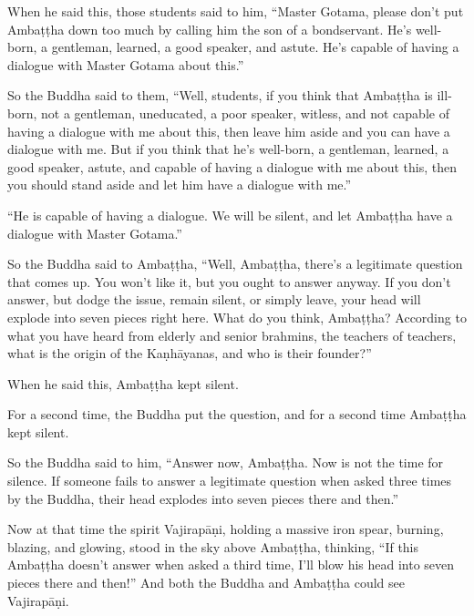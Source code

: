 \documentclass[12pt,openany]{book}%
\begin{document}
When he said this, those students said to him, “Master Gotama, please don’t put \textsanskrit{Ambaṭṭha} down too much by calling him the son of a bondservant. He’s well-born, a gentleman, learned, a good speaker, and astute. He’s capable of having a dialogue with Master Gotama about this.” 

So the Buddha said to them, “Well, students, if you think that \textsanskrit{Ambaṭṭha} is ill-born, not a gentleman, uneducated, a poor speaker, witless, and not capable of having a dialogue with me about this, then leave him aside and you can have a dialogue with me. But if you think that he’s well-born, a gentleman, learned, a good speaker, astute, and capable of having a dialogue with me about this, then you should stand aside and let him have a dialogue with me.” 

“He is capable of having a dialogue. We will be silent, and let \textsanskrit{Ambaṭṭha} have a dialogue with Master Gotama.” 

So the Buddha said to \textsanskrit{Ambaṭṭha}, “Well, \textsanskrit{Ambaṭṭha}, there’s a legitimate question that comes up. You won’t like it, but you ought to answer anyway. If you don’t answer, but dodge the issue, remain silent, or simply leave, your head will explode into seven pieces right here. What do you think, \textsanskrit{Ambaṭṭha}? According to what you have heard from elderly and senior brahmins, the teachers of teachers, what is the origin of the \textsanskrit{Kaṇhāyanas}, and who is their founder?” 

When he said this, \textsanskrit{Ambaṭṭha} kept silent. 

For a second time, the Buddha put the question, and for a second time \textsanskrit{Ambaṭṭha} kept silent. 

So the Buddha said to him, “Answer now, \textsanskrit{Ambaṭṭha}. Now is not the time for silence. If someone fails to answer a legitimate question when asked three times by the Buddha, their head explodes into seven pieces there and then.” 

Now at that time the spirit \textsanskrit{Vajirapāṇi}, holding a massive iron spear, burning, blazing, and glowing, stood in the sky above \textsanskrit{Ambaṭṭha}, thinking, “If this \textsanskrit{Ambaṭṭha} doesn’t answer when asked a third time, I’ll blow his head into seven pieces there and then!” And both the Buddha and \textsanskrit{Ambaṭṭha} could see \textsanskrit{Vajirapāṇi}. 
\end{document}
